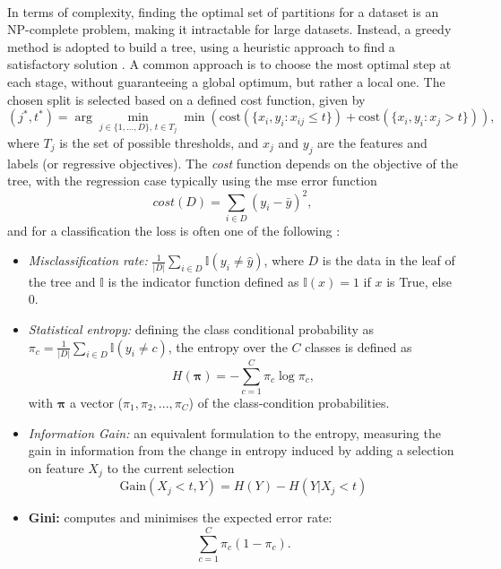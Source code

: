 \paragraph{}In terms of complexity, finding the optimal set of partitions for a dataset is an NP-complete problem, making it intractable for large datasets. Instead, a greedy method is adopted to build a tree, using a heuristic approach to find a satisfactory solution \cite{MurphyML}. A common approach is to choose the most optimal step at each stage, without guaranteeing a global optimum, but rather a local one. The chosen split is selected based on a defined cost function, given by
\begin{equation}\label{eq:DTcost}
    (j^*, t^*) = \arg\min_{j\in \{1, ..., D\},\, t \in T_j} \min \left(\text{cost} (\{x_i, y_i : x_{ij} \leq t\}) + \text{cost}(\{x_i, y_i : x_j > t\}) \right),
\end{equation}
where $T_j$ is the set of possible thresholds, and $x_j$ and $y_j$ are the features and labels (or regressive objectives). The \textit{cost} function depends on the objective of the tree, with the regression case typically using the \gls{mse} error function \[cost(D) = \sum_{i\in D}(y_i - \bar{y})^2,\] and for a classification the loss is often one of the following \cite{MurphyML}:
\begin{itemize}
    \item \textit{Misclassification rate:} $\frac{1}{|D|} \sum_{i \in D} \mathbb{I}(y_i \neq \hat{y})$, where $D$ is the data in the leaf of the tree and $\mathbb{I}$ is the indicator function defined as $\mathbb{I}(x) = 1$ if $x$ is True, else $0$. 
    \item \textit{Statistical entropy:} defining the class conditional probability as $\pi_c = \frac{1}{|D|} \sum_{i \in D} \mathbb{I}(y_i \neq c)$, the entropy over the $C$ classes is defined as
    \begin{equation}\label{eq:statEntropy}
        H(\boldsymbol{\pi}) = - \sum_{c=1}^C \pi_c \log \pi_c,
    \end{equation}
    with $\boldsymbol{\pi}$ a vector ($\pi_1, \pi_2, ..., \pi_C$) of the class-condition probabilities.
    \item \textit{Information Gain:} an equivalent formulation to the entropy, measuring the gain in information from the change in entropy induced by adding a selection on feature $X_j$ to the current selection 
    \[ \text{Gain}(X_j < t, Y) = H(Y) - H(Y | X_j < t) \]
    \item \textbf{Gini:} computes and minimises the expected error rate:
    \begin{equation}\label{eq:giniClass} 
        \sum_{c=1}^C \pi_c (1 - \pi_c).
    \end{equation}
\end{itemize}

